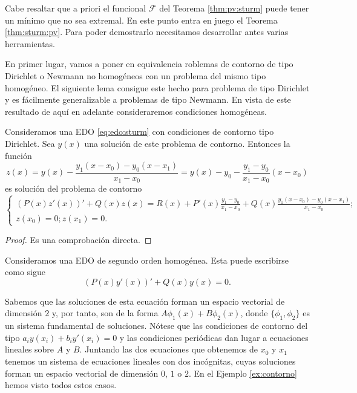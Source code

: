 \documentclass{article}
\begin{document}
Cabe resaltar que a priori el funcional $\mathcal{F}$ del Teorema \ref{thm:pv:sturm} puede tener un
mínimo que no sea extremal. En este punto entra en juego el Teorema \ref{thm:sturm:pv}. Para poder
demostrarlo necesitamos desarrollar antes varias herramientas.


En primer lugar, vamos a poner en equivalencia roblemas de contorno de tipo Dirichlet o Newmann no
homogéneos con un problema del mismo tipo homogéneo. El siguiente lema consigue este hecho para
problema de tipo Dirichlet y es fácilmente generalizable a problemas de tipo Newmann. En vista de
este resultado de aquí en adelante consideraremos condiciones homogéneas.


\begin{lemma} \label{lem:pc:hom} Consideramos una EDO \eqref{eq:edo:sturm} con condiciones de
  contorno tipo Dirichlet. Sea $y(x)$ una solución de este problema de contorno. Entonces la función
  \[ z(x) = y(x) - \frac{y_1(x-x_0) - y_0(x-x_1)}{x_1- x_0} = y(x) - y_0 - \frac{y_1 - y_0}{x_1-
      x_0}(x-x_0) \] es solución del problema de contorno
  \[
    \begin{cases}
      (P(x)z'(x))' + Q(x)z(x) = R(x) + P'(x) \frac{y_1 - y_0}{x_1- x_0} + Q(x)  \frac{y_1(x-x_0) - y_0(x-x_1)}{x_1- x_0}; \\
      z(x_0) = 0; z(x_1) = 0.
    \end{cases}
  \]
\end{lemma}
\begin{proof}
  Es una comprobación directa.
\end{proof}

Consideramos una EDO de segundo orden homogénea. Esta puede escribirse como sigue
\begin{equation}
  \label{eq:sturm:eh}
  (P(x)y'(x))' + Q(x)y(x) = 0.
  \tag{SH}
\end{equation}

Sabemos que las soluciones de esta ecuación forman un espacio vectorial de dimensión $2$ y, por
tanto, son de la forma $A \phi_1(x) + B \phi_2(x)$, donde $\{\phi_1, \phi_2\}$ es un sistema
fundamental de soluciones. Nótese que las condiciones de contorno del tipo
$a_i y(x_i) + b_i y'(x_i) = 0$ y las condiciones periódicas dan lugar a ecuaciones lineales sobre
$A$ y $B$. Juntando las dos ecuaciones que obtenemos de $x_0$ y $x_1$ tenemos un sistema de
ecuaciones lineales con dos incógnitas, cuyas soluciones forman un espacio vectorial de dimensión
$0$, $1$ o $2$. En el Ejemplo \ref{ex:contorno} hemos visto todos estos casos.
\end{document}
